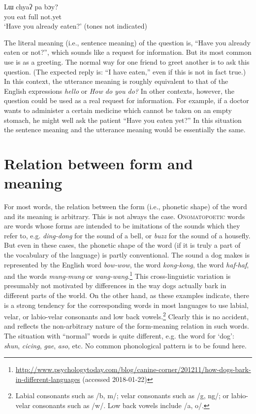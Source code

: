 \ea \label{ex:2}
\gll Lɯ  chyaʔ  pa  bɔy?\\
you  eat  full  not.yet\\
\glt ‘Have you already eaten?’  (tones not indicated)
\z


The literal meaning (i.e., sentence meaning) of the question is, “Have you already eaten or not?”, which sounds like a request for information. But its most common use is as a greeting. The normal way for one friend to greet another is to ask this question. (The expected reply is: “I have eaten,” even if this is not in fact true.) In this context, the utterance meaning is roughly equivalent to that of the English expressions \textit{hello} or \textit{How do you do?} In other contexts, however, the question could be used as a real request for information. For example, if a doctor wants to administer a certain medicine which cannot be taken on an empty stomach, he might well ask the patient “Have you eaten yet?” In this situation the sentence meaning and the utterance meaning would be essentially the same.


\section{Relation between form and meaning}\label{sec:1.3}

For most words, the relation between the form (i.e., phonetic shape) of the word and its meaning is arbitrary. This is not always the case. \textsc{Onomatopoetic} words are words whose forms are intended to be imitations of the sounds which they refer to, e.g. \textit{ding-dong} for the sound of a bell, or \textit{buzz} for the sound of a housefly. But even in these cases, the phonetic shape of the word (if it is truly a part of the vocabulary of the language) is partly conventional. The sound a dog makes is represented by the English word \textit{bow-wow}, the  word \textit{kong-kong}, the  word \textit{haf-haf}, and the  words \textit{mung-mung} or \textit{wang-wang}.\footnote{\url{http://www.psychologytoday.com/blog/canine-corner/201211/how-dogs-bark-in-different-languages} (accessed 2018-01-22)} This cross-linguistic variation is presumably not motivated by differences in the way dogs actually bark in different parts of the world. On the other hand, as these examples indicate, there is a strong tendency for the corresponding words in most languages to use labial, velar, or labio-velar consonants and low back vowels.\footnote{Labial consonants such as /b, m/; velar consonants such as /g, ng/; or labio-velar consonants such as /w/. Low back vowels include /a, o/.} Clearly this is no accident, and reflects the non-arbitrary nature of the form-meaning relation in such words. The situation with “normal” words is quite different, e.g. the word for ‘dog’:  \textit{shun},  \textit{cicing},  \textit{gae},  \textit{aso}, etc. No common phonological pattern is to be found here.



